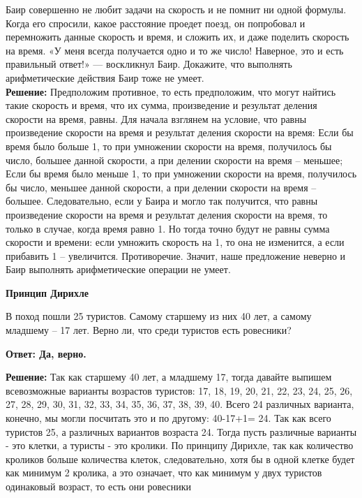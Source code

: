  Баир совершенно не любит задачи на скорость и не помнит ни одной формулы. Когда его спросили, какое расстояние проедет поезд, он попробовал и перемножить данные скорость и время, и сложить их, и даже поделить скорость на время. «У меня всегда получается одно и то же число! Наверное, это и есть правильный ответ!» — воскликнул Баир. Докажите, что выполнять арифметические действия Баир тоже не умеет.\\

\textbf{Решение:} Предположим противное, то есть предположим, что могут найтись такие скорость и время, что их сумма, произведение и результат деления скорости на время, равны.
Для начала взглянем на условие, что равны произведение скорости на время и результат деления скорости на время:
Если бы время было больше 1, то при умножении скорости на время, получилось бы число, большее данной скорости, а при делении скорости на время – меньшее;
Если бы время было меньше 1, то при умножении скорости на время, получилось бы число, меньшее данной скорости, а при делении скорости на время – большее.
Следовательно, если у Баира и могло так получится, что равны произведение скорости на время и результат деления скорости на время, то только в случае, когда время равно 1.
Но тогда точно будут не равны сумма скорости и времени: если умножить скорость на 1, то она не изменится, а если прибавить 1 – увеличится. Противоречие. Значит, наше предложение неверно и Баир выполнять арифметические операции не умеет.\\

\begin{flushleft}
  \textbf{\Large Принцип Дирихле}
\end{flushleft}

В поход пошли 25 туристов. Самому старшему из них 40 лет, а самому младшему – 17 лет. Верно ли, что среди туристов есть ровесники?
\newpage

\textbf{Ответ: Да, верно.}\par
\textbf{Решение:} Так как старшему 40 лет, а младшему 17, тогда давайте выпишем всевозможные варианты возрастов туристов: 17, 18, 19, 20, 21, 22, 23, 24, 25, 26, 27, 28, 29, 30, 31, 32, 33, 34, 35, 36, 37, 38, 39, 40.
Всего 24 различных варианта, конечно, мы могли посчитать это и по другому: 40-17+1= 24. Так как всего туристов 25, а различных вариантов возраста 24. Тогда пусть различные варианты - это клетки, а туристы - это кролики. По принципу Дирихле, так как количество кроликов больше количества клеток, следовательно, хотя бы в одной клетке будет как минимум 2 кролика, а это означает, что как минимум у двух туристов одинаковый возраст, то есть они ровесники\\

